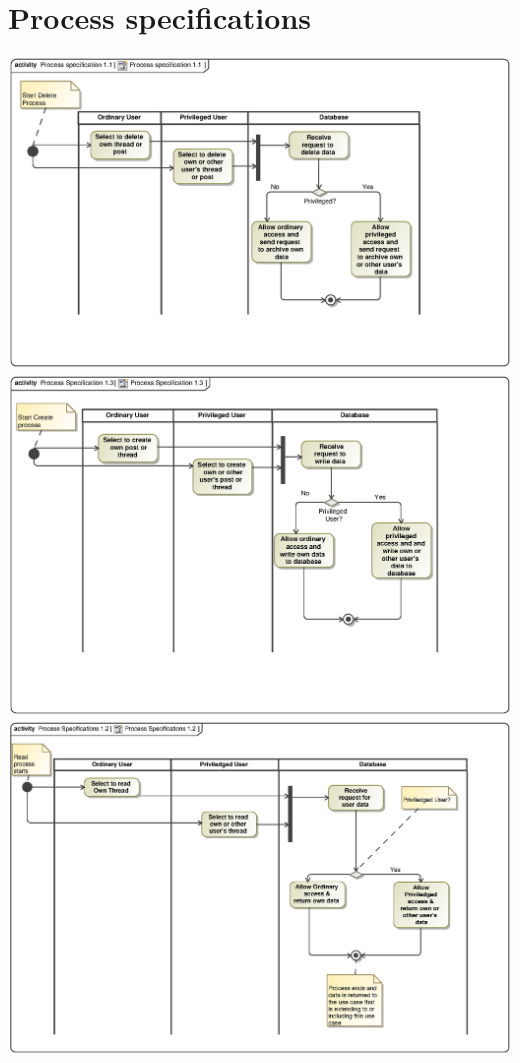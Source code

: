 \documentclass{scrreprt}
\begin{document}
\chapter{Process specifications}							%
\includegraphics[scale=.9]{ProcessSpecificationCRUD1.eps}\\
\includegraphics[scale=.9]{ProcessSpecificationCRUD3.eps}\\
\includegraphics[scale=.9]{ProcessSpecificationsCRUD2.eps}\\
\end{document}
